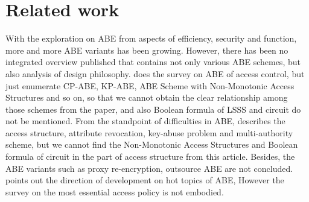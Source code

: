 \section{Related work}
With the exploration on ABE from aspects of efficiency, security and function, 
more and more ABE variants has been growing. 
However, there has been no integrated overview published that contains not only various ABE schemes, 
but also analysis of design philosophy. 
\cite{IE:survey} does the survey on ABE of access control, 
but just enumerate CP-ABE, KP-ABE, ABE Scheme with Non-Monotonic Access Structures and so on, 
so that we cannot obtain the clear relationship among those schemes from the paper, 
and also Boolean formula of LSSS and circuit do not be mentioned.
From the standpoint of difficulties in ABE, 
\cite{Su:survey} describes the access structure, attribute revocation, key-abuse problem and multi-authority scheme, 
 but we cannot find the Non-Monotonic Access Structures and Boolean formula of circuit in the part of access structure from this article.
Besides, the ABE variants such as proxy re-encryption, outsource ABE are not concluded.  
\cite{Feng:survey} points out the direction of development on hot topics of ABE, 
However the survey on the most essential access policy is not embodied. 




